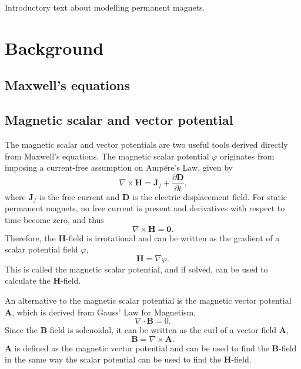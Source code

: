 Introductory text about modelling permanent magnets.

\section{Background}

\subsection{Maxwell's equations}

\subsection{Magnetic scalar and vector potential}
The magnetic scalar and vector potentials are two useful tools derived directly from Maxwell's equations. The magnetic scalar potential \(\varphi\) originates from imposing a current-free assumption on Amp\'ere's Law, given by
\begin{equation}
    \nabla \times \mathbf{H} = \mathbf{J}_f + \frac{\partial \mathbf{D}}{\partial t} \text{,}
\end{equation}
where \(\mathbf{J}_f\) is the free current and \(\mathbf{D}\) is the electric displacement field. For static permanent magnets, no free current is present and derivatives with respect to time become zero, and thus
\begin{equation}
    \nabla \times \mathbf{H} = \mathbf{0} \text{.}
\end{equation}
Therefore, the \(\mathbf{H}\)-field is irrotational and can be written as the gradient of a scalar potential field \(\varphi\),
\begin{equation}
    \mathbf{H} = \nabla \varphi \text{.}
\end{equation}
This is called the magnetic scalar potential, and if solved, can be used to calculate the \(\mathbf{H}\)-field.

An alternative to the magnetic scalar potential is the magnetic vector potential \(\mathbf{A}\), which is derived from Gauss' Law for Magnetism,
\begin{equation}
    \nabla \cdot \mathbf{B} = 0 \text{.}
\end{equation}
Since the \(\mathbf{B}\)-field is solenoidal, it can be written as the curl of a vector field \(\mathbf{A}\),
\begin{equation}
    \mathbf{B} = \nabla \times \mathbf{A} \text{.}
\end{equation}
\(\mathbf{A}\) is defined as the magnetic vector potential and can be used to find the \(\mathbf{B}\)-field in the same way the scalar potential can be used to find the \(\mathbf{H}\)-field.

